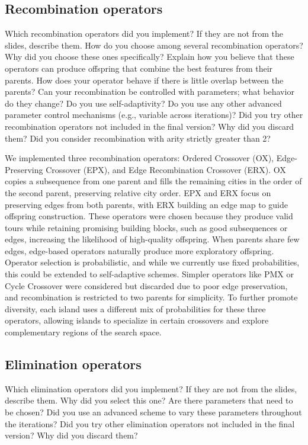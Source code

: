 \documentclass[a4paper,10pt]{article}
\newcommand{\ReplaceMe}[1]{{\color{blue}#1}}
\begin{document}
\subsection{Recombination operators}

\ReplaceMe{Which recombination operators did you implement? If they are not from the slides, describe them. How do you choose among several recombination operators? Why did you choose these ones specifically? Explain how you believe that these operators can produce offspring that combine the best features from their parents. How does your operator behave if there is little overlap between the parents? Can your recombination be controlled with parameters; what behavior do they change? Do you use self-adaptivity? Do you use any other advanced parameter control mechanisms (e.g., variable across iterations)? Did you try other recombination operators not included in the final version? Why did you discard them? Did you consider recombination with arity strictly greater than 2?}

\noindent
We implemented three recombination operators: Ordered Crossover (OX), Edge-Preserving Crossover (EPX), and Edge Recombination Crossover (ERX). OX copies a subsequence from one parent and fills the remaining cities in the order of the second parent, preserving relative city order. EPX and ERX focus on preserving edges from both parents, with ERX building an edge map to guide offspring construction. These operators were chosen because they produce valid tours while retaining promising building blocks, such as good subsequences or edges, increasing the likelihood of high-quality offspring. When parents share few edges, edge-based operators naturally produce more exploratory offspring. Operator selection is probabilistic, and while we currently use fixed probabilities, this could be extended to self-adaptive schemes. Simpler operators like PMX or Cycle Crossover were considered but discarded due to poor edge preservation, and recombination is restricted to two parents for simplicity. To further promote diversity, each island uses a different mix of probabilities for these three operators, allowing islands to specialize in certain crossovers and explore complementary regions of the search space.

\subsection{Elimination operators}

\ReplaceMe{Which elimination operators did you implement? If they are not from the slides, describe them. Why did you select this one? Are there parameters that need to be chosen? Did you use an advanced scheme to vary these parameters throughout the iterations? Did you try other elimination operators not included in the final version? Why did you discard them?} 
\end{document}
